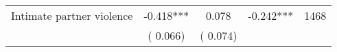 \begin{tabular}{l*{4}{c}}
 Intimate partner violence &             -0.418*** &         0.078 &          -0.242*** & 1468                       \\  
                 &        (       0.066)                   &        (       0.074)                        &                                                             &                                                      \\      

\hline \end{tabular}                                                                                                              
